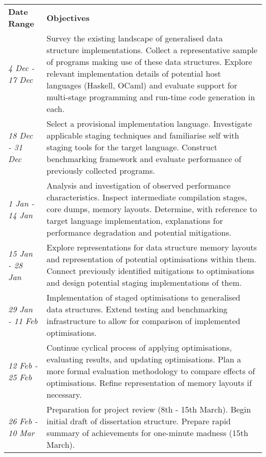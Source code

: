 \documentclass[11pt]{article}
\begin{document}
\begin{longtable}{p{}p{}}
  \toprule
  \addlinespace[-0.25em]
  \textbf{Date Range} & \textbf{Objectives} \\
  \addlinespace[-0.25em]
  \midrule
  \textsl{4 Dec - 17 Dec} & Survey the existing landscape of generalised data structure implementations. Collect a representative sample of programs making use of these data structures. Explore relevant implementation details of potential host languages (Haskell, OCaml) and evaluate support for multi-stage programming and run-time code generation in each.\\

  \textsl{18 Dec - 31 Dec} & Select a provisional implementation language. Investigate applicable staging techniques and familiarise self with staging tools for the target language. Construct benchmarking framework and evaluate performance of previously collected programs.\\

  \textsl{1 Jan - 14 Jan} & Analysis and investigation of observed performance characteristics. Inspect intermediate compilation stages, core dumps, memory layouts. Determine, with reference to target language implementation, explanations for performance degradation and potential mitigations.\\

  \textsl{15 Jan - 28 Jan} & Explore representations for data structure memory layouts and representation of potential optimisations within them. Connect previously identified mitigations to optimisations and design potential staging implementations of them.\\

  \textsl{29 Jan - 11 Feb} & Implementation of staged optimisations to generalised data structures. Extend testing and benchmarking infrastructure to allow for comparison of implemented optimisations.\\

  \textsl{12 Feb - 25 Feb} & Continue cyclical process of applying optimisations, evaluating results, and updating optimisations. Plan a more formal evaluation methodology to compare effects of optimisations. Refine representation of memory layouts if necessary.\\

  \textsl{26 Feb - 10 Mar} & Preparation for project review (8th - 15th March). Begin initial draft of dissertation structure. Prepare rapid summary of achievements for one-minute madness (15th March).\\


\end{longtable}
\end{document}
